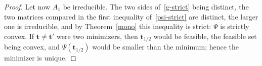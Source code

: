\documentclass[11pt]{article}
\theoremstyle{plain}
\theoremstyle{definition}
\theoremstyle{remark}
\numberwithin{equation}{section}
\numberwithin{figure}{section}
\numberwithin{table}{section}
\numberwithin{algorithm}{section}
\begin{document}
\begin{proof}
Let now $A_1$ be irreducible.
The two sides of~\eqref{g-strict} being distinct, the two matrices compared
in the first inequality of~\eqref{psi-strict} are distinct, the larger one is
irreducible, and by Theorem~\ref{mono} this inequality is strict: $\Psi$ is strictly convex. If $\bm t\neq\bm t'$ were two minimizers, then
$\bm t_{1/2}$ would be feasible, the feasible set being convex, and
$\Psi\left(\bm t_{1/2}\right)$ would be smaller than the minimum; hence the
minimizer is unique.
\end{proof}



\end{document}
